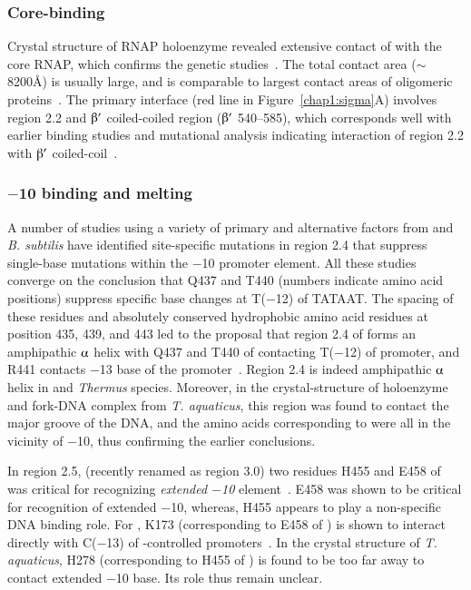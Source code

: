 \subsubsection{Core-binding}
\label{chap1:core_binding} Crystal structure of RNAP holoenzyme
revealed extensive contact of \s{} with the core RNAP, which
confirms the genetic studies~\citep{Sharp1999}. The total contact
area (\U{$\sim$8200}{\AA}) is usually large, and is comparable to
largest contact areas of oligomeric
proteins~\citep{Murakami2002b}. The primary interface (red line in
Figure~\ref{chap1:sigma}A) involves region 2.2 and $\betaup'$
coiled-coiled region ($\betaup'$ 540--585), which corresponds well
with earlier binding studies and mutational analysis indicating
interaction of region 2.2 with $\betaup'$
coiled-coil~\citep{Sharp1999,Arthur2000,Joo1997,Young2001}.

\subsubsection{$-$10 binding and melting}

\label{chap1:melting} A number of studies using a variety of
primary and alternative \s{} factors from  and \emph{B.
subtilis} have identified site-specific mutations in region 2.4
that suppress single-base mutations within the $-$10 promoter
element. All these studies converge on the conclusion that Q437
and T440 (numbers indicate  \siga{} amino acid positions)
suppress specific base changes at T($-$12) of
TATAAT. The spacing of these residues and
absolutely conserved hydrophobic amino acid residues at position
435, 439, and 443 led to the proposal that region 2.4 of \s{}
forms an amphipathic $\alphaup$ helix with Q437 and T440 of \s{}
contacting T($-$12) of promoter, and R441 contacts $-$13 base of
the
promoter~\citep{Siegele1989,Kenny1989,Daniels1990,Waldburger1990}.
Region 2.4 is indeed amphipathic $\alphaup$ helix in  and
\emph{Thermus} species. Moreover, in the crystal-structure of
holoenzyme and fork-DNA complex from \emph{T. aquaticus}, this
region was found to contact the major groove of the DNA, and the
amino acids corresponding to  \s{} were all in the
vicinity of $-$10, thus confirming the earlier conclusions.

In region 2.5, (recently renamed as region 3.0) two residues H455
and E458 of  \siga{} was critical for recognizing
\emph{extended $-$10} element~\citep{Barne1997}. E458 was shown to
be critical for recognition of extended $-$10, whereas, H455
appears to play a non-specific DNA binding role. For 
\sigs{}, K173 (corresponding to E458 of \siga{}) is shown to
interact directly with C($-$13) of \sigs{}-controlled
promoters~\citep{Becker2001}. In the crystal structure of \emph{T.
aquaticus}, H278 (corresponding to H455 of ) is found to
be too far away to contact extended $-$10 base. Its role thus
remain unclear.

